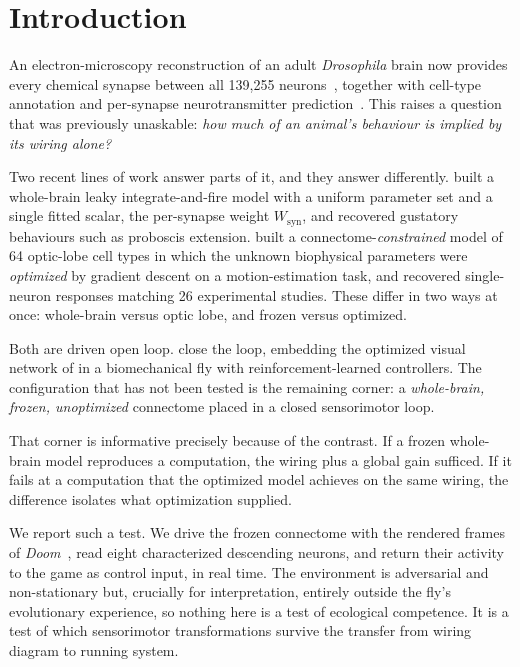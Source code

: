\documentclass[10pt,twoside]{article}
\begin{document}
\section{Introduction}

An electron-microscopy reconstruction of an adult \emph{Drosophila} brain now
provides every chemical synapse between all 139{,}255
neurons~\citep{dorkenwald2024}, together with cell-type annotation
\citep{schlegel2024} and per-synapse neurotransmitter
prediction~\citep{eckstein2024}. This raises a question that was previously
unaskable: \emph{how much of an animal's behaviour is implied by its wiring
alone?}

Two recent lines of work answer parts of it, and they answer differently.
\citet{shiu2024} built a whole-brain leaky integrate-and-fire model with a
uniform parameter set and a single fitted scalar, the per-synapse weight
$W_{\mathrm{syn}}$, and recovered gustatory behaviours such as
proboscis extension. \citet{lappalainen2024} built a connectome-\emph{constrained}
model of 64 optic-lobe cell types in which the unknown biophysical parameters
were \emph{optimized} by gradient descent on a motion-estimation task, and
recovered single-neuron responses matching 26 experimental studies. These
differ in two ways at once: whole-brain versus optic lobe, and frozen versus
optimized.

Both are driven open loop. \citet{wangchen2024} close the loop, embedding the
optimized visual network of \citet{lappalainen2024} in a biomechanical fly with
reinforcement-learned controllers. The configuration that has not been tested
is the remaining corner: a \emph{whole-brain, frozen, unoptimized} connectome
placed in a closed sensorimotor loop.

That corner is informative precisely because of the contrast. If a frozen
whole-brain model reproduces a computation, the wiring plus a global gain
sufficed. If it fails at a computation that the optimized model achieves on the
same wiring, the difference isolates what optimization supplied.

We report such a test. We drive the frozen connectome with the rendered frames
of \emph{Doom}~\citep{kempka2016}, read eight characterized
descending neurons, and return their activity to the game as control input, in
real time. The environment is adversarial and non-stationary but, crucially
for interpretation, entirely outside the fly's evolutionary experience, so
nothing here is a test of ecological competence. It is a test of which
sensorimotor transformations survive the transfer from wiring diagram to
running system.
\end{document}
